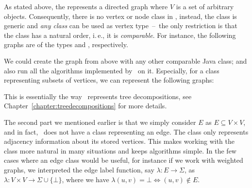 \documentclass[a4paper, ukenglish, twoside, openright]{jdrasilmanual}
\begin{document}
As stated above, 
the  represents a directed graph where
$V$ is a set of arbitrary objects.  Consequently, there is no vertex
or node class in \Jdrasil, instead, the  class is
generic and \emph{any class} can be used as vertex type~–~the only
restriction is that the class has a natural order, i.\,e., it is
\emph{comparable}. For instance, the following graphs are of the types
 and , respectively.
\begin{center}
\end{center}
We could create the graph from above with any other comparable Java
class; and also run all the algorithms implemented by \Jdrasil\ on
it. Especially, for a class representing subsets of vertices, we can
represent the following graphs:
\begin{center}
\end{center}
This is essentially the way \Jdrasil\ represents tree decompositions,
see Chapter~\ref{chapter:treedecompositions} for more details.

The second part we mentioned earlier is that we simply consider $E$ as
$E\subseteq V\times V$, and in fact, \Jdrasil\ does not have a class
representing an edge. The  class only represents
adjacency information about its stored vertices. This makes working
with the  class more natural in many situations and
keeps algorithms simple. In the few cases where an edge class would be
useful, for instance if we work with weighted graphs, we interpreted
the edge label function, say $\lambda\colon E\rightarrow\Sigma$, as
$\lambda\colon V\times V\rightarrow\Sigma\cup\{\bot\}$, where we have
$\lambda(u,v)=\bot\Leftrightarrow (u,v)\not\in E$.
\end{document}
